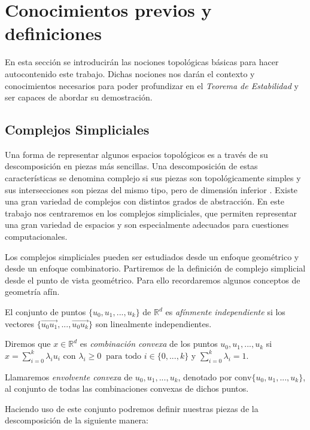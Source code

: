 
\section{Conocimientos previos y definiciones}\label{sec:bg}
En esta sección se introducirán las nociones topológicas básicas para hacer autocontenido este trabajo. Dichas nociones nos darán el contexto y conocimientos necesarios para poder profundizar en el \emph{Teorema de Estabilidad} y ser capaces de abordar su demostración.

\subsection{Complejos Simpliciales}

Una forma de representar algunos espacios topológicos es a través de su descomposición en piezas más sencillas. Una descomposición de estas características se denomina complejo si sus piezas son topológicamente simples y sus intersecciones son piezas del mismo tipo, pero de dimensión inferior \cite{libroEH}. Existe una gran variedad de complejos con distintos grados de abstracción. En este trabajo nos centraremos en los complejos simpliciales, que permiten representar una gran variedad de espacios y son especialmente adecuados para cuestiones computacionales.

Los complejos simpliciales pueden ser estudiados desde un enfoque geométrico y desde un enfoque combinatorio. Partiremos de la definición de complejo simplicial desde el punto de vista geométrico. Para ello recordaremos algunos conceptos de geometría afín.

\begin{definition}
El conjunto de puntos $\{u_0, u_1, ..., u_k\}$ de $\mathbb{R}^d$ es \emph{afínmente independiente} si los vectores $\{\overrightarrow{u_0u_1}, ..., \overrightarrow{u_0u_k}\}$ son linealmente independientes.
\end{definition}

\begin{definition}
\begin{sloppypar}
Diremos que $x \in \mathbb{R}^d$ es \emph{combinación convexa} de los puntos ${u_0, u_1, ..., u_k}$ si $x = \sum_{i=0}^{k} \lambda_i u_i$ con $\lambda_i \geq 0 \ \text{ para todo } i \in \{0,...,k\}$ y $\sum_{i=0}^{k} \lambda_i = 1$.
\end{sloppypar}
\end{definition}

\begin{definition}
\begin{sloppypar}
Llamaremos \emph{envolvente convexa} de $u_0, u_1, ..., u_k$, denotado por ${\text{conv}\{u_0, u_1, ..., u_k\}}$, al conjunto de todas las combinaciones convexas de dichos puntos.
\end{sloppypar}
\end{definition}
Haciendo uso de este conjunto podremos definir nuestras piezas de la descomposición de la siguiente manera:

